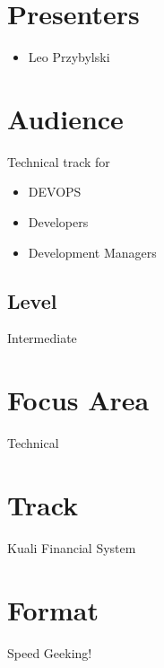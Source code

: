\documentclass[12pt,notitlepage]{article}
\begin{document}
\section{Presenters}
\begin{itemize}
\item Leo Przybylski
\end{itemize}

\section{Audience}
Technical track for
\begin{itemize}
\item DEVOPS
\item Developers
\item Development Managers
\end{itemize}

\subsection{Level}
Intermediate

\section{Focus Area}
Technical

\section{Track}
Kuali Financial System

\section{Format}
Speed Geeking!
\end{document}
